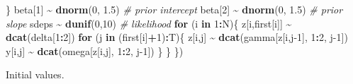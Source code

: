 \documentclass[
  12pt,
]{krantz}
\newenvironment{Shaded}{\begin{snugshade}}{\end{snugshade}}
\newcommand{\AttributeTok}[1]{\textcolor[rgb]{0.13,0.29,0.53}{#1}}
\newcommand{\CommentTok}[1]{\textcolor[rgb]{0.56,0.35,0.01}{\textit{#1}}}
\newcommand{\ControlFlowTok}[1]{\textcolor[rgb]{0.13,0.29,0.53}{\textbf{#1}}}
\newcommand{\DecValTok}[1]{\textcolor[rgb]{0.00,0.00,0.81}{#1}}
\newcommand{\FloatTok}[1]{\textcolor[rgb]{0.00,0.00,0.81}{#1}}
\newcommand{\FunctionTok}[1]{\textcolor[rgb]{0.13,0.29,0.53}{\textbf{#1}}}
\newcommand{\NormalTok}[1]{#1}
\newcommand{\OtherTok}[1]{\textcolor[rgb]{0.56,0.35,0.01}{#1}}
\newcommand{\SpecialCharTok}[1]{\textcolor[rgb]{0.81,0.36,0.00}{\textbf{#1}}}
\begin{document}
\begin{Shaded}
\begin{Highlighting}[]
\NormalTok{  \}}
\NormalTok{  beta[}\DecValTok{1}\NormalTok{] }\SpecialCharTok{\textasciitilde{}} \FunctionTok{dnorm}\NormalTok{(}\DecValTok{0}\NormalTok{, }\FloatTok{1.5}\NormalTok{) }\CommentTok{\# prior intercept}
\NormalTok{  beta[}\DecValTok{2}\NormalTok{] }\SpecialCharTok{\textasciitilde{}} \FunctionTok{dnorm}\NormalTok{(}\DecValTok{0}\NormalTok{, }\FloatTok{1.5}\NormalTok{) }\CommentTok{\# prior slope}
\NormalTok{  sdeps }\SpecialCharTok{\textasciitilde{}} \FunctionTok{dunif}\NormalTok{(}\DecValTok{0}\NormalTok{,}\DecValTok{10}\NormalTok{)}
  \CommentTok{\# likelihood}
  \ControlFlowTok{for}\NormalTok{ (i }\ControlFlowTok{in} \DecValTok{1}\SpecialCharTok{:}\NormalTok{N)\{}
\NormalTok{    z[i,first[i]] }\SpecialCharTok{\textasciitilde{}} \FunctionTok{dcat}\NormalTok{(delta[}\DecValTok{1}\SpecialCharTok{:}\DecValTok{2}\NormalTok{])}
    \ControlFlowTok{for}\NormalTok{ (j }\ControlFlowTok{in}\NormalTok{ (first[i]}\SpecialCharTok{+}\DecValTok{1}\NormalTok{)}\SpecialCharTok{:}\NormalTok{T)\{}
\NormalTok{      z[i,j] }\SpecialCharTok{\textasciitilde{}} \FunctionTok{dcat}\NormalTok{(gamma[z[i,j}\DecValTok{{-}1}\NormalTok{], }\DecValTok{1}\SpecialCharTok{:}\DecValTok{2}\NormalTok{, j}\DecValTok{{-}1}\NormalTok{])}
\NormalTok{      y[i,j] }\SpecialCharTok{\textasciitilde{}} \FunctionTok{dcat}\NormalTok{(omega[z[i,j], }\DecValTok{1}\SpecialCharTok{:}\DecValTok{2}\NormalTok{, j}\DecValTok{{-}1}\NormalTok{])}
\NormalTok{    \}}
\NormalTok{  \}}
\NormalTok{\})}
\end{Highlighting}
\end{Shaded}

Initial values.

\begin{Shaded}
\end{Shaded}
\end{document}
